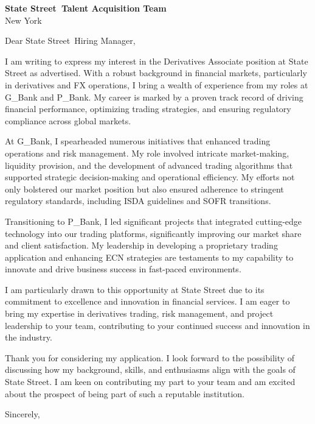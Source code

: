 \documentclass{letter}
\newcommand{\company}{State Street}
\begin{document}
\begin{letter}{\textbf{\company\ Talent Acquisition Team} \\                
                New York }

\opening{Dear \company\ Hiring Manager,}

I am writing to express my interest in the Derivatives Associate position at State Street as advertised. With a robust background in financial markets, particularly in derivatives and FX operations, I bring a wealth of experience from my roles at G_Bank and P_Bank. My career is marked by a proven track record of driving financial performance, optimizing trading strategies, and ensuring regulatory compliance across global markets.

At G_Bank, I spearheaded numerous initiatives that enhanced trading operations and risk management. My role involved intricate market-making, liquidity provision, and the development of advanced trading algorithms that supported strategic decision-making and operational efficiency. My efforts not only bolstered our market position but also ensured adherence to stringent regulatory standards, including ISDA guidelines and SOFR transitions.

Transitioning to P_Bank, I led significant projects that integrated cutting-edge technology into our trading platforms, significantly improving our market share and client satisfaction. My leadership in developing a proprietary trading application and enhancing ECN strategies are testaments to my capability to innovate and drive business success in fast-paced environments.

I am particularly drawn to this opportunity at State Street due to its commitment to excellence and innovation in financial services. I am eager to bring my expertise in derivatives trading, risk management, and project leadership to your team, contributing to your continued success and innovation in the industry.

Thank you for considering my application. I look forward to the possibility of discussing how my background, skills, and enthusiasms align with the goals of State Street. I am keen on contributing my part to your team and am excited about the prospect of being part of such a reputable institution.



\closing{Sincerely,}

\end{letter}
\end{document}
